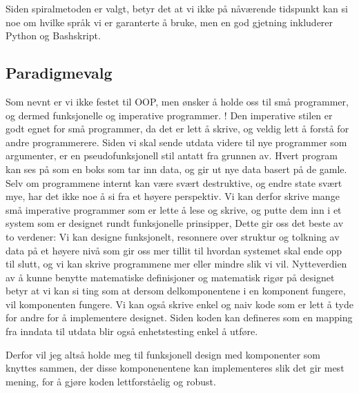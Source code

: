 \documentclass[11pt]{article}
\begin{document}
Siden spiralmetoden er valgt, betyr det at vi ikke på nåværende tidspunkt kan si noe om hvilke språk vi er garanterte å bruke, men en god gjetning inkluderer Python og Bashskript.

\subsection{Paradigmevalg}
Som nevnt er vi ikke festet til OOP, men ønsker å holde oss til små programmer, og dermed funksjonelle og imperative programmer.
!
Den imperative stilen er godt egnet for små programmer, da det er lett å skrive, og veldig lett å forstå for andre programmerere.
Siden vi skal sende utdata videre til nye programmer som argumenter, er en pseudofunksjonell stil antatt fra grunnen av. Hvert program kan ses på som en boks som tar inn data, og gir ut nye data basert på de gamle.
Selv om programmene internt kan være svært destruktive, og endre state svært mye, har det ikke noe å si fra et høyere perspektiv.
Vi kan derfor skrive mange små imperative programmer som er lette å lese og skrive, og putte dem inn i et system som er designet rundt funksjonelle prinsipper,
Dette gir oss det beste av to verdener: Vi kan designe funksjonelt, resonnere over struktur og tolkning av data på et høyere nivå som gir oss mer tillit til hvordan systemet skal ende opp til slutt,
og vi kan skrive programmene mer eller mindre slik vi vil.
Nytteverdien av å kunne benytte matematiske definisjoner og matematisk rigør på designet betyr at vi kan si ting som at dersom delkomponentene i en komponent fungere, vil komponenten fungere.
Vi kan også skrive enkel og naiv kode som er lett å tyde for andre for å implementere designet. Siden koden kan defineres som en mapping fra inndata til utdata blir også enhetstesting enkel å utføre.

Derfor vil jeg altså holde meg til funksjonell design med komponenter som knyttes sammen, der disse komponenentene kan implementeres slik det gir mest mening, for å gjøre koden lettforståelig og robust.
\end{document}
